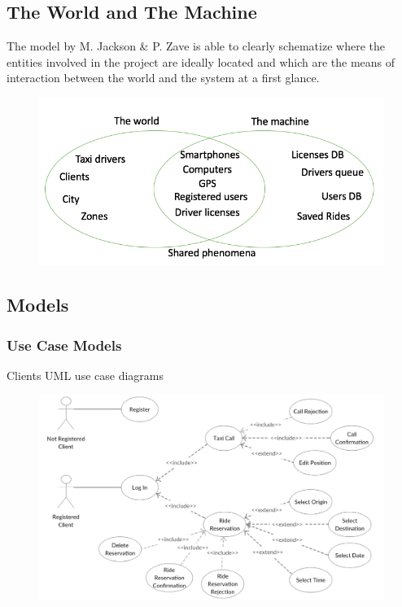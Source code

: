 \documentclass[9pt]{beamer}
\makeatletter
\newcommand*{\currentname}{\@currentlabelname}
\makeatother
\begin{document}
\subsection{The World and The Machine}
\begin{frame}{\currentname}
The model by M. Jackson \& P. Zave is able to clearly schematize where the entities involved in the project are ideally located and which are the means of interaction between the world and the system at a first glance.

\begin{figure}[H]
\includegraphics[height=0.5\textheight]{WorldAndMachine}
\centering
\end{figure}
\end{frame}

\subsection{Models}
\subsubsection{Use Case Models}
\begin{frame}{Clients UML use case diagrams}
\begin{figure}[H]
\includegraphics[height=0.8\textheight]{UseCase-Client}
\centering
\label{fig:usecaseclient}
\end{figure}
\end{frame}
\end{document}
